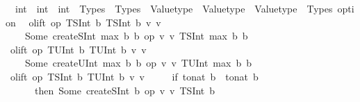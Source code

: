 \begin{isabellebody}
\ \ {\isachardoublequoteopen}{\isacharparenleft}{\kern0pt}int\ {\isasymRightarrow}\ int\ {\isasymRightarrow}\ int{\isacharparenright}{\kern0pt}\ {\isasymRightarrow}\ Types\ {\isasymRightarrow}\ Types\ {\isasymRightarrow}\ Valuetype\ {\isasymRightarrow}\ Valuetype\ {\isasymRightarrow}\ {\isacharparenleft}{\kern0pt}Valuetype\ {\isacharasterisk}{\kern0pt}\ Types{\isacharparenright}{\kern0pt}\ option{\isachardoublequoteclose}\isanewline
{}\isanewline
\ \ {\isachardoublequoteopen}olift\ op\ {\isacharparenleft}{\kern0pt}TSInt\ b{}{\isacharparenright}{\kern0pt}\ {\isacharparenleft}{\kern0pt}TSInt\ b{}{\isacharparenright}{\kern0pt}\ v{}\ v{}\ {\isacharequal}{\kern0pt}\isanewline
\ \ \ \ Some\ {\isacharparenleft}{\kern0pt}createSInt\ {\isacharparenleft}{\kern0pt}max\ b{}\ b{}{\isacharparenright}{\kern0pt}\ {\isacharparenleft}{\kern0pt}op\ {\isasymlceil}v{}{\isasymrceil}\ {\isasymlceil}v{}{\isasymrceil}{\isacharparenright}{\kern0pt}{\isacharcomma}{\kern0pt}\ TSInt\ {\isacharparenleft}{\kern0pt}max\ b{}\ b{}{\isacharparenright}{\kern0pt}{\isacharparenright}{\kern0pt}{\isachardoublequoteclose}\isanewline
{\isacharbar}{\kern0pt}\ {\isachardoublequoteopen}olift\ op\ {\isacharparenleft}{\kern0pt}TUInt\ b{}{\isacharparenright}{\kern0pt}\ {\isacharparenleft}{\kern0pt}TUInt\ b{}{\isacharparenright}{\kern0pt}\ v{}\ v{}\ {\isacharequal}{\kern0pt}\isanewline
\ \ \ \ Some\ {\isacharparenleft}{\kern0pt}createUInt\ {\isacharparenleft}{\kern0pt}max\ b{}\ b{}{\isacharparenright}{\kern0pt}\ {\isacharparenleft}{\kern0pt}op\ {\isasymlceil}v{}{\isasymrceil}\ {\isasymlceil}v{}{\isasymrceil}{\isacharparenright}{\kern0pt}{\isacharcomma}{\kern0pt}\ TUInt\ {\isacharparenleft}{\kern0pt}max\ b{}\ b{}{\isacharparenright}{\kern0pt}{\isacharparenright}{\kern0pt}{\isachardoublequoteclose}\isanewline
{\isacharbar}{\kern0pt}\ {\isachardoublequoteopen}olift\ op\ {\isacharparenleft}{\kern0pt}TSInt\ b{}{\isacharparenright}{\kern0pt}\ {\isacharparenleft}{\kern0pt}TUInt\ b{}{\isacharparenright}{\kern0pt}\ v{}\ v{}\ {\isacharequal}{\kern0pt}\isanewline
\ \ \ \ {\isacharparenleft}{\kern0pt}if\ to{\isacharunderscore}{\kern0pt}nat\ b{}\ {\isacharless}{\kern0pt}\ to{\isacharunderscore}{\kern0pt}nat\ b{}\isanewline
\ \ \ \ \ \ then\ Some\ {\isacharparenleft}{\kern0pt}createSInt\ b{}\ {\isacharparenleft}{\kern0pt}op\ {\isasymlceil}v{}{\isasymrceil}\ {\isasymlceil}v{}{\isasymrceil}{\isacharparenright}{\kern0pt}{\isacharcomma}{\kern0pt}\ TSInt\ b{}{\isacharparenright}{\kern0pt}\isanewline

\end{isabellebody}
